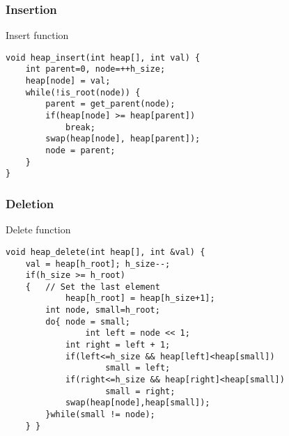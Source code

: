 \documentclass{beamer}
\begin{document}
\begin{frame}[fragile]

\frametitle{Insertion}

\begin{block}{Insert function}
\begin{lstlisting}
void heap_insert(int heap[], int val) {
    int parent=0, node=++h_size;
    heap[node] = val;
    while(!is_root(node)) {
        parent = get_parent(node);
        if(heap[node] >= heap[parent])
            break;
        swap(heap[node], heap[parent]);
        node = parent;
 	}
}
\end{lstlisting}
\end{block}
\end{frame}

\begin{frame}[fragile]
\frametitle{Deletion}
\begin{block}{Delete function}
\begin{lstlisting}
void heap_delete(int heap[], int &val) {
    val = heap[h_root]; h_size--;
    if(h_size >= h_root)
    {   // Set the last element
        	heap[h_root] = heap[h_size+1];
        int node, small=h_root;
        do{	node = small;
            	int left = node << 1;
            int right = left + 1;
            if(left<=h_size && heap[left]<heap[small])
                	small = left;
            if(right<=h_size && heap[right]<heap[small])
                	small = right;
            swap(heap[node],heap[small]);
        }while(small != node);
    } }
\end{lstlisting}
\end{block}

\end{frame}

\end{document}
